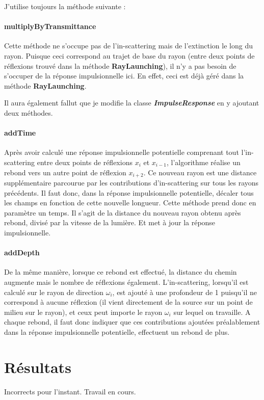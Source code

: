 J'utilise toujours la méthode suivante :

\paragraph{multiplyByTransmittance} Cette méthode ne s'occupe pas de l'in-scattering mais de l'extinction le long du rayon. Puisque ceci correspond au trajet de base du rayon (entre deux points de réflexions trouvé dans la méthode \textbf{RayLaunching}), il n'y a pas besoin de s'occuper de la réponse impulsionnelle ici. En effet, ceci est déjà géré dans la méthode \textbf{RayLaunching}. \newline\newline\par

Il aura également fallut que je modifie la classe \textit{\textbf{ImpulseResponse}} en y ajoutant deux méthodes.

\paragraph{addTime} Après avoir calculé une réponse impulsionnelle potentielle comprenant tout l'in-scattering entre deux points de réflexions $x_i$ et $x_{i-1}$, l'algorithme réalise un rebond vers un autre point de réflexion $x_{i+2}$. Ce nouveau rayon est une distance supplémentaire parcourue par les contributions d'in-scattering sur tous les rayons précédents. Il faut donc, dans la réponse impulsionnelle potentielle, décaler tous les champs en fonction de cette nouvelle longueur. Cette méthode prend donc en paramètre un temps. Il s'agit de la distance du nouveau rayon obtenu après rebond, divisé par la vitesse de la lumière. Et met à jour la réponse impulsionnelle.

\paragraph{addDepth} De la même manière, lorsque ce rebond est effectué, la distance du chemin augmente mais le nombre de réflexions également. L'in-scattering, lorsqu'il est calculé sur le rayon de direction $\omega_i$, est ajouté à une profondeur de 1 puisqu'il ne correspond à aucune réflexion (il vient directement de la source sur un point de milieu sur le rayon), et ceux peut importe le rayon $\omega_i$ sur lequel on travaille. A chaque rebond, il faut donc indiquer que ces contributions ajoutées préalablement dans la réponse impulsionnelle potentielle, effectuent un rebond de plus.


\section{Résultats}

Incorrects pour l'instant. Travail en cours.